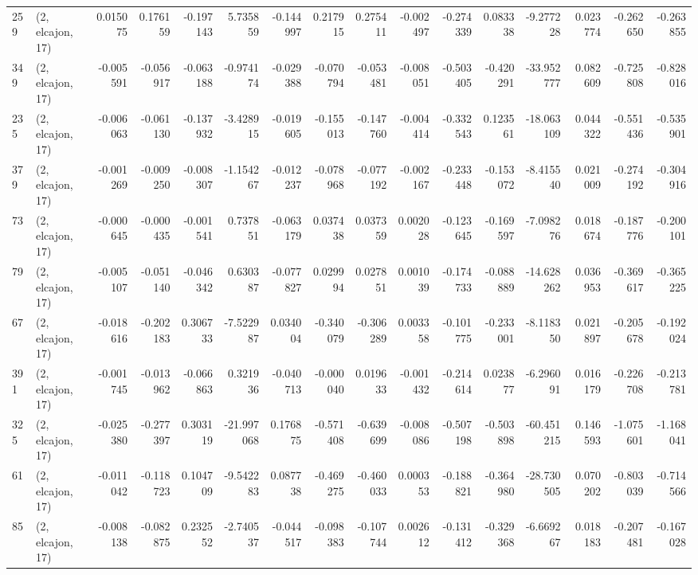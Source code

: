 \begin{tabular}{llrrrrrrrrrrrrrr}
259 &  (2, elcajon, 17) &   0.015075 &  0.176159 & -0.197143 &   5.735859 & -0.144997 &   0.217915 &  0.275411 & -0.002497 & -0.274339 &  0.083338 &    -9.277228 &   0.023774 &  -0.262650 &  -0.263855 \\
349 &  (2, elcajon, 17) &  -0.005591 & -0.056917 & -0.063188 &  -0.974174 & -0.029388 &  -0.070794 & -0.053481 & -0.008051 & -0.503405 & -0.420291 &   -33.952777 &   0.082609 &  -0.725808 &  -0.828016 \\
235 &  (2, elcajon, 17) &  -0.006063 & -0.061130 & -0.137932 &  -3.428915 & -0.019605 &  -0.155013 & -0.147760 & -0.004414 & -0.332543 &  0.123561 &   -18.063109 &   0.044322 &  -0.551436 &  -0.535901 \\
379 &  (2, elcajon, 17) &  -0.001269 & -0.009250 & -0.008307 &  -1.154267 & -0.012237 &  -0.078968 & -0.077192 & -0.002167 & -0.233448 & -0.153072 &    -8.415540 &   0.021009 &  -0.274192 &  -0.304916 \\
73  &  (2, elcajon, 17) &  -0.000645 & -0.000435 & -0.001541 &   0.737851 & -0.063179 &   0.037438 &  0.037359 &  0.002028 & -0.123645 & -0.169597 &    -7.098276 &   0.018674 &  -0.187776 &  -0.200101 \\
79  &  (2, elcajon, 17) &  -0.005107 & -0.051140 & -0.046342 &   0.630387 & -0.077827 &   0.029994 &  0.027851 &  0.001039 & -0.174733 & -0.088889 &   -14.628262 &   0.036953 &  -0.369617 &  -0.365225 \\
67  &  (2, elcajon, 17) &  -0.018616 & -0.202183 &  0.306733 &  -7.522987 &  0.034004 &  -0.340079 & -0.306289 &  0.003358 & -0.101775 & -0.233001 &    -8.118350 &   0.021897 &  -0.205678 &  -0.192024 \\
391 &  (2, elcajon, 17) &  -0.001745 & -0.013962 & -0.066863 &   0.321936 & -0.040713 &  -0.000040 &  0.019633 & -0.001432 & -0.214614 &  0.023877 &    -6.296091 &   0.016179 &  -0.226708 &  -0.213781 \\
325 &  (2, elcajon, 17) &  -0.025380 & -0.277397 &  0.303119 & -21.997068 &  0.176875 &  -0.571408 & -0.639699 & -0.008086 & -0.507198 & -0.503898 &   -60.451215 &   0.146593 &  -1.075601 &  -1.168041 \\
61  &  (2, elcajon, 17) &  -0.011042 & -0.118723 &  0.104709 &  -9.542283 &  0.087738 &  -0.469275 & -0.460033 &  0.000353 & -0.188821 & -0.364980 &   -28.730505 &   0.070202 &  -0.803039 &  -0.714566 \\
85  &  (2, elcajon, 17) &  -0.008138 & -0.082875 &  0.232552 &  -2.740537 & -0.044517 &  -0.098383 & -0.107744 &  0.002612 & -0.131412 & -0.329368 &    -6.669267 &   0.018183 &  -0.207481 &  -0.167028 \\

\end{tabular}

